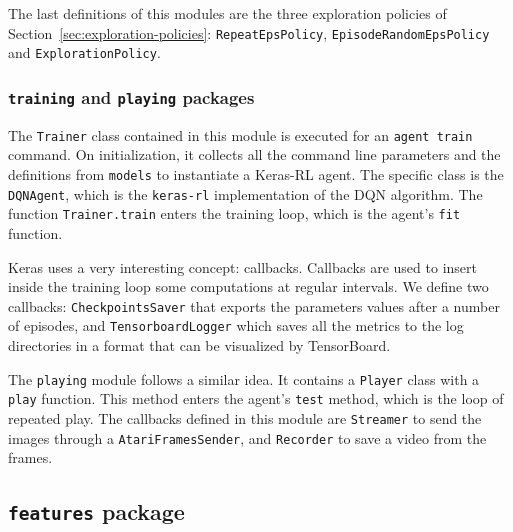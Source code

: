 The last definitions of this modules are the three exploration policies of
Section~\ref{sec:exploration-policies}: \texttt{RepeatEpsPolicy},
\texttt{EpisodeRandomEpsPolicy} and \texttt{ExplorationPolicy}.


\subsubsection*{\texttt{training} and \texttt{playing} packages}

The \texttt{Trainer} class contained in this module is executed for an
\lstinline[style=python]|agent train| command. On initialization, it collects
all the command line parameters and the definitions from \texttt{models} to
instantiate a Keras-RL agent. The specific class is the \texttt{DQNAgent},
which is the \texttt{keras-rl} implementation of the DQN algorithm. The
function \verb|Trainer.train| enters the training loop, which is the agent's
\texttt{fit} function.

Keras uses a very interesting concept: callbacks. Callbacks are used to insert
inside the training loop some computations at regular intervals. We define two
callbacks: \texttt{CheckpointsSaver} that exports the parameters values after
a number of episodes, and \texttt{TensorboardLogger} which saves all the
metrics to the log directories in a format that can be visualized by
TensorBoard.

The \texttt{playing} module follows a similar idea. It contains a
\texttt{Player} class with a \texttt{play} function. This method enters the
agent's \texttt{test} method, which is the loop of repeated play. The
callbacks defined in this module are \texttt{Streamer} to send the images
through a \texttt{AtariFramesSender}, and \texttt{Recorder} to save a video
from the frames.


\subsection{\texttt{features} package}


